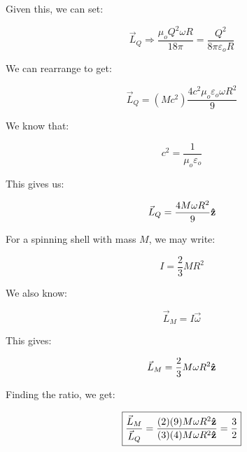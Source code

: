 \begin{enumerate}
\begin{enumerate}
        Given this, we can set:

        $$\vec{L}_Q\Rightarrow\frac{\mu_oQ^2\omega R}{18\pi}=\frac{Q^2}{8\pi\varepsilon_o R}$$

        We can rearrange to get:

        $$\vec{L}_Q=(Mc^2)\frac{4c^2\mu_o\varepsilon_o\omega R^2}{9}$$

        We know that:

        $$c^2=\frac{1}{\mu_o\varepsilon_o}$$

        This gives us:

        $$\vec{L}_Q=\frac{4M\omega R^2}{9}\bold{\hat{z}}$$

        For a spinning shell with mass $M$, we may write:

        $$I=\frac{2}{3}MR^2$$

        We also know:

        $$\vec{L}_M=I\vec{\omega}$$

        This gives:

        $$\vec{L}_M=\frac{2}{3}M\omega R^2\bold{\hat{z}}$$

        Finding the ratio, we get:

        $$\boxed{\frac{\vec{L}_M}{\vec{L}_Q}=\frac{(2)(9)M\omega R^2\bold{\hat{z}}}{(3)(4)M\omega R^2\bold{\hat{z}}}=\frac{3}{2}}$$

    \end{enumerate}

\end{enumerate}



